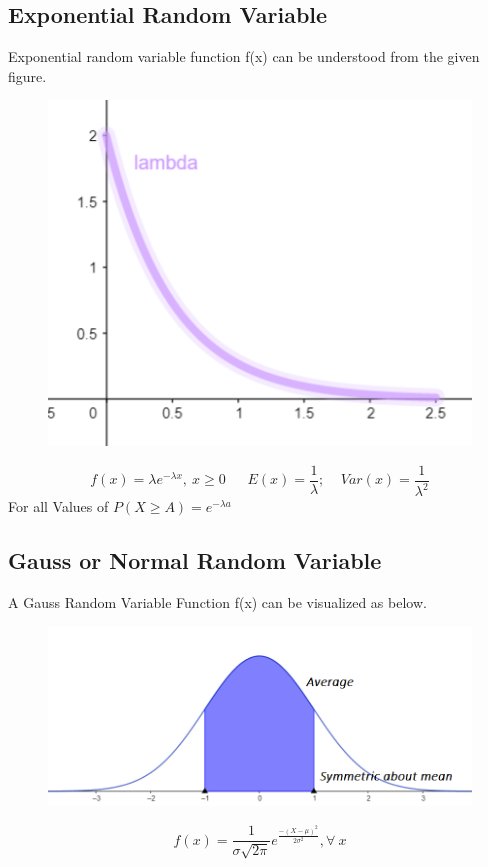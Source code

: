 \subsection{Exponential Random Variable}
Exponential random variable function f(x) can be understood from the given figure.
\begin{figure}[h!]
    \centering
    \includegraphics[scale=0.7]{images/exponential-random-variable.png}
\end{figure}
\[f(x)=\lambda e^{-\lambda x},\ x \geq 0\ \ \ \ \ \ \ E(x)=\frac{1}{\lambda};\ \ \ \ \ Var(x)=\frac{1}{\lambda^2}\]
For all Values of \(P(X\geq A)=e^{-\lambda a}\)


\subsection{Gauss or Normal Random Variable}
A Gauss Random Variable Function f(x) can be visualized as below.
\begin{figure}[h!]
    \centering
    \includegraphics[scale=0.5]{images/normal-random-variable.png}
\end{figure}
\[f(x)=\frac{1}{\sigma \sqrt{2\pi}}e^{\frac{-(X-\mu)^2}{2\sigma^2}},\forall\ x\]


